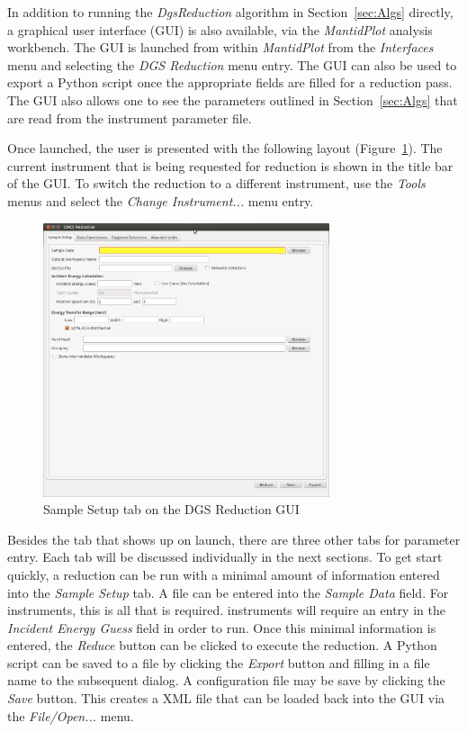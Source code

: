 In addition to running the \textit{DgsReduction} algorithm in Section~\ref{sec:Algs} directly, a graphical user interface (GUI) is also available, via the \textit{MantidPlot} analysis workbench. The GUI is launched from within \textit{MantidPlot} from the \textit{Interfaces} menu and selecting the \textit{DGS Reduction} menu entry. The GUI can also be used to export a Python script once the appropriate fields are filled for a reduction pass. The GUI also allows one to see the parameters outlined in Section~\ref{sec:Algs} that are read from the instrument parameter file. 

Once launched, the user is presented with the following layout (Figure~\ref{fig:SamSet}). The current instrument that is being requested for reduction is shown in the title bar of the GUI. To switch the reduction to a different instrument, use the \textit{Tools} menus and select the \textit{Change Instrument...} menu entry. 
\begin{figure}[ht]
\centerline{\includegraphics[width=0.75\textwidth]{figures/SampleSetup.png}}
\caption{Sample Setup tab on the DGS Reduction GUI}
\label{fig:SamSet}
\end{figure}
Besides the tab that shows up on launch, there are three other tabs for parameter entry. Each tab will be discussed individually in the next sections. To get start quickly, a reduction can be run with a minimal amount of information entered into the \textit{Sample Setup} tab. A file can be entered into the \textit{Sample Data} field. For \sns{} instruments, this is all that is required. \isis{} instruments will require an entry in the \textit{Incident Energy Guess} field in order to run. Once this minimal information is entered, the \textit{Reduce} button can be clicked to execute the reduction. A Python script can be saved to a file by clicking the \textit{Export} button and filling in a file name to the subsequent dialog. A configuration file may be save by clicking the \textit{Save} button. This creates a XML file that can be loaded back into the GUI via the \textit{File/Open...} menu.
